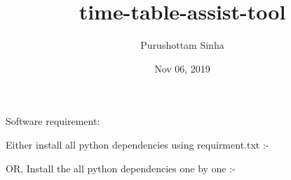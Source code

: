 \documentclass[letterpaper,10pt,english]{sphinxmanual}
\title{time-table-assist-tool}
\date{Nov 06, 2019}
\author{Purushottam Sinha}
\begin{document}
\pagestyle{empty}
\sphinxmaketitle
\pagestyle{plain}
\sphinxtableofcontents
\pagestyle{normal}
\label{\detokenize{index::doc}}



\chapter{}
\label{\detokenize{user_manual:user-manual}}\label{\detokenize{user_manual::doc}}

\section{}
\label{\detokenize{user_manual:setting-up-the-project}}
Software requirement:

Either install all python dependencies using requirment.txt :-

\begin{sphinxVerbatim}[commandchars=\\\{\}]
   
\end{sphinxVerbatim}

OR, Install the all python dependencies one by one :-

\begin{sphinxVerbatim}[commandchars=\\\{\}]
   
 
  
  
  
  
  
  
  
\end{sphinxVerbatim}
\end{document}
